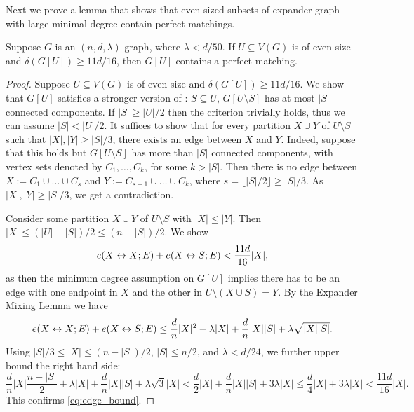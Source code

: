\documentclass[11pt]{article}
\begin{document}


Next we prove a lemma that shows that even sized subsets of expander graph with large minimal degree contain perfect matchings.
\begin{lemma}\label{thm:perfect-matching}
Suppose $G$ is an $(n, d, \lambda)$-graph, where $\lambda < d/50$. If $U \subseteq V(G)$ is of even size and $\delta(G[U]) \ge 11d/16$, then $G[U]$ contains a perfect matching.
\end{lemma}

\begin{proof}
  Suppose $U \subseteq V(G)$ is of even size and $\delta(G[U]) \ge 11d/16$.
  We show that $G[U]$ satisfies a stronger version of :  $S \subseteq U$, $G[U \setminus S]$ has at most $|S|$ connected components.
  If $|S| \ge |U|/2$ then the criterion trivially holds, thus we can assume $|S| < |U|/2$.
  It suffices to show that for every partition $X \cup Y$ of $U \setminus S$ such that $|X|, |Y| \ge |S|/3$, there exists an edge between $X$ and $Y$.
  Indeed, suppose that this holds but $G[U \setminus S]$ has more than $|S|$ connected components, with vertex sets denoted by $C_1, \ldots, C_k$, for some $k > |S|$.
  Then there is no edge between $X := C_1 \cup \ldots \cup C_{s}$ and $Y := C_{s+1} \cup \ldots \cup C_{k}$, where $s = \lfloor |S|/2 \rfloor \ge |S|/3$. As $|X|, |Y| \ge |S|/3$, we get a contradiction.

    Consider some partition $X \cup Y$ of $U \setminus S$ with $|X| \le |Y|$. Then $|X| \le (|U| - |S|)/2 \le (n - |S|)/2$. We show
    \begin{equation} \label{eq:edge_bound}
        e(X \leftrightarrow X; E) + e(X \leftrightarrow S; E) < \frac{11d}{16}|X|,
    \end{equation}
    as then the minimum degree assumption on $G[U]$ implies there has to be an edge with one endpoint in $X$ and the other in $U \setminus (X \cup S) = Y$. By the Expander Mixing Lemma we have
    \[
        e(X \leftrightarrow X; E) + e(X \leftrightarrow S; E) \le \frac{d}{n}|X|^2 + \lambda |X| + \frac{d}{n}|X||S| + \lambda\sqrt{|X||S|}.
    \]
    Using $|S|/3 \le |X| \le (n-|S|)/2$, $|S| \le n/2$, and $\lambda < d/24$,  we further upper bound the right hand side:
    \[
        \frac{d}{n} |X| \frac{n-|S|}{2} + \lambda |X| + \frac{d}{n}|X||S| + \lambda\sqrt{3} |X| < \frac{d}{2}|X| + \frac{d}{n}|X||S| + 3 \lambda |X| \le \frac{d}{4} |X| + 3\lambda |X| < \frac{11d}{16}|X|.
    \]
    This confirms \eqref{eq:edge_bound}.
\end{proof}
\end{document}
